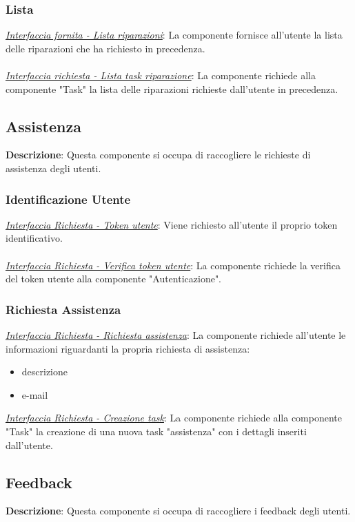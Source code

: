 \documentclass{report}
\begin{document}
\subsubsection*{\indent \indent Lista}
\uline{\textit{Interfaccia fornita - Lista riparazioni}}: %
La componente fornisce all'utente la lista delle riparazioni che ha richiesto in precedenza.\\\\
\uline{\textit{Interfaccia richiesta - Lista task riparazione}}: 
La componente richiede alla componente "Task" la lista delle riparazioni richieste dall'utente in precedenza.

\subsection*{Assistenza}
\textbf{Descrizione}: Questa componente si occupa di raccogliere le richieste di assistenza degli utenti.
\subsubsection*{\indent \indent Identificazione Utente}
\textcolor{Auth}{\uline{\textit{Interfaccia Richiesta - Token utente}}}: 
Viene richiesto all'utente il proprio token identificativo.\\\\
\textcolor{Auth}{\uline{\textit{Interfaccia Richiesta - Verifica token utente}}}:
La componente richiede la verifica del token utente alla componente "Autenticazione".
\subsubsection*{\indent \indent Richiesta Assistenza}
\uline{\textit{Interfaccia Richiesta - Richiesta assistenza}}:
La componente richiede all'utente le informazioni riguardanti la propria richiesta di assistenza:
\begin{itemize}
	\item descrizione
	\item e-mail
\end{itemize}
\uline{\textit{Interfaccia Richiesta - Creazione task}}:
La componente richiede alla componente "Task" la creazione di una nuova task "assistenza" con i dettagli inseriti dall'utente.

\subsection*{Feedback}
\textbf{Descrizione}: Questa componente si occupa di raccogliere i feedback degli utenti.
\end{document}

